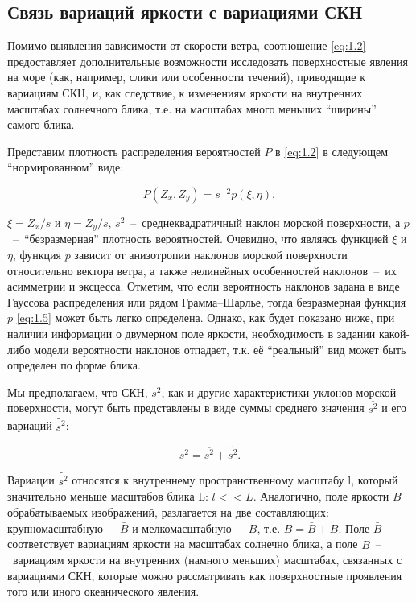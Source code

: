 \subsection{Связь вариаций яркости с вариациями СКН}



Помимо выявления зависимости от скорости ветра, соотношение \eqref{eq:1.2} предоставляет дополнительные возможности исследовать поверхностные явления на море (как, например, слики или особенности течений), приводящие к вариациям СКН, и, как следствие, к изменениям яркости на внутренних масштабах солнечного блика, т.е. на масштабах много меньших ``ширины'' самого блика.

Представим плотность распределения вероятностей $P$ в \eqref{eq:1.2} в следующем ``нормированном'' виде:


\begin{equation} \label{eq:1.5} 
    P(Z_{x} ,Z_{y} )=s^{-2} p(\xi ,\eta ), 
\end{equation} 


 $\xi =Z_{x} /s$ и $\eta =Z_{y} /s$, $s^{2} $~--~среднеквадратичный наклон морской поверхности, а $p$~--~``безразмерная'' плотность вероятностей. Очевидно, что являясь функцией $\xi $ и $\eta $, функция $p$ зависит от анизотропии наклонов морской поверхности относительно вектора ветра, а также нелинейных особенностей наклонов~--~их асимметрии и эксцесса. Отметим, что если вероятность наклонов задана в виде Гауссова распределения или рядом Грамма--Шарлье, тогда безразмерная функция $p$ \eqref{eq:1.5} может быть легко определена. Однако, как будет показано ниже, при наличии информации о двумерном поле яркости, необходимость в задании какой-либо модели вероятности наклонов отпадает, т.к. её ``реальный'' вид может быть определен по форме блика. 

Мы предполагаем, что СКН, $s^{2} $, как и другие характеристики уклонов морской поверхности, могут быть представлены в виде суммы среднего значения $\overline{s^{2} }$ и его вариаций $\widetilde{s^{2} }$:


\begin{equation} \label{eq:1.6}
    s^{2} =\overline{s^{2} }+\widetilde{s^{2} }.
\end{equation}


Вариации $\widetilde{s^{2} }$ относятся к внутреннему пространственному масштабу l, который значительно меньше масштабов блика L: $l<<L$. Аналогично, поле яркости $B$ обрабатываемых изображений, разлагается на две составляющих: крупномасштабную~--~$\bar{B}$ и мелкомасштабную~--~$\tilde{B}$, т.е. $B=\bar{B}+\tilde{B}$. Поле $\bar{B}$ соответствует вариациям яркости на масштабах солнечно блика, а поле $\tilde{B}$~--~вариациям яркости на внутренних (намного меньших) масштабах, связанных с вариациями СКН, которые можно рассматривать как поверхностные проявления того или иного океанического явления.

